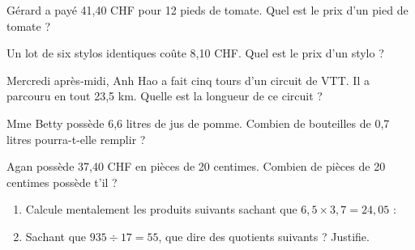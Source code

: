 \begin{exercice}
Gérard a payé 41,40 CHF pour 12 pieds de tomate. Quel est le prix d'un pied de tomate ?
\end{exercice}



\begin{exercice}
Un lot de six stylos identiques coûte 8,10 CHF. Quel est le prix d'un stylo ?
\end{exercice}


\begin{exercice}
Mercredi après‑midi, Anh Hao a fait cinq tours d'un circuit de VTT. Il a parcouru en tout 23,5 km. Quelle est la longueur de ce circuit ?
\end{exercice}


\begin{exercice}
Mme Betty possède 6,6 litres de jus de pomme. Combien de bouteilles de 0,7 litres pourra-t-elle remplir ?
\end{exercice}

\begin{exercice}
Agan possède 37,40 CHF en pièces de 20 centimes. Combien de pièces de 20 centimes possède t'il ?
\end{exercice}


\begin{exercice}


\begin{enumerate}
 \item Calcule mentalement les produits suivants sachant que $6,5 \times 3,7 = 24,05$ :
  
 \item Sachant que $935 \div 17 = 55$, que dire des quotients suivants ? Justifie.   
 \end{enumerate}
\end{exercice}


